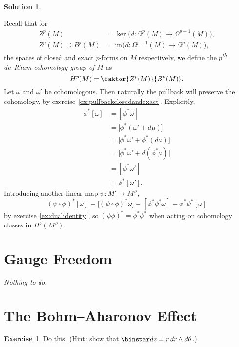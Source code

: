 \documentclass[11pt, a4paper]{report}
\theoremstyle{definition}
\newtheorem{exercise}{Exercise}[part]
\newtheorem{solution}{Solution}[part]
\newenvironment{ex}{\begin{exercise}}{\end{exercise}\pagebreak[1]}
\newenvironment{sol}{\begin{solution}}{\end{solution}\pagebreak[3]}
\renewcommand*{\d}{\ensuremath\mathop{}\mathopen{}d}
\renewcommand*{\star}{\ensuremath\mathop{}\mathopen\binstar\mathord{}}
\begin{document}
\begin{sol}\label{sol:pullbackcohomology}

Recall that for
\begin{align*}
    Z^p(M) &= \ker \bigl( d: \Omega^p(M) \to \Omega^{p + 1}(M) \bigr), \\
    Z^p(M) \supseteq B^p(M) &= \text{im} \bigl( d: \Omega^{p - 1}(M) \to \Omega^p(M) \bigr),
\end{align*}
the spaces of closed and exact $p$-forms on $M$ respectively, we define the \emph{$p$\textsuperscript{th} de~Rham cohomology group of $M$} as
\[
    H^p(M) = \faktor{Z^p(M)}{B^p(M)}.
\]
Let $\omega$ and $\omega'$ be cohomologous. Then naturally the pullback will preserve the cohomology, by exercise~\ref{ex:pullbackclosedandexact}. Explicitly,
\begin{align*}
    \phi^*[\omega] &= [\phi^* \omega] \\
                   &= \bigl[ \phi^*(\omega' + d\mu) \bigr] \\
                   &= \bigl[ \phi^* \omega' + \phi^* (d\mu) \bigr] \\
                   &= \bigl[ \phi^* \omega' + d(\phi^*\mu) \bigr] \\
                   &= [\phi^* \omega'] \\
                   &= \phi^* [\omega'].
\end{align*}
Introducing another linear map $\psi: M' \to M''$,
\[
    {(\psi \circ \phi)}^*[\omega] = \bigl[ {(\psi \circ \phi)}^* \omega \bigr]
                                  = [\phi^* \psi^* \omega]
                                  = \phi^* \psi^* [\omega]
\]
by exercise~\ref{ex:dualidentity}, so ${(\psi \phi)}^* = \phi^* \psi^*$ when acting on cohomology classes in $H^p(M'')$.

\end{sol}

\section{Gauge Freedom}

\emph{Nothing to do.}

\section{The Bohm--Aharonov Effect}

\begin{ex}

Do this. (Hint: show that $\star dz = r \d r \wedge d\theta$.)

\end{ex}
\end{document}
